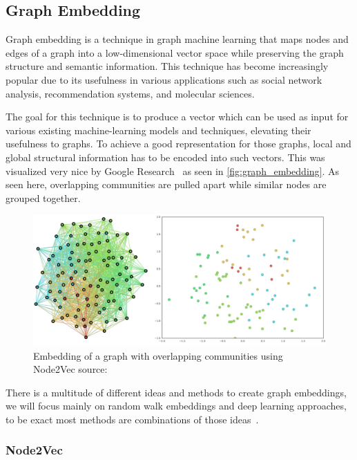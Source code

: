 \subsection{Graph Embedding}
Graph embedding is a technique in graph machine learning that maps nodes and edges of a graph into a low-dimensional vector space while preserving the graph structure and semantic information. This technique has become increasingly popular due to its usefulness in various applications such as social network analysis, recommendation systems, and molecular sciences.

The goal for this technique is to produce a vector which can be used as input for various existing machine-learning models and techniques, elevating their usefulness to graphs. To achieve a good representation for those graphs, local and global structural information has to be encoded into such vectors. This was visualized very nice by Google Research~\cite{epasto2019embedding} as seen in \autoref{fig:graph_embedding}. As seen here, overlapping communities are pulled apart while similar nodes are grouped together.

\begin{figure}[ht!]
    \centering
    \includegraphics[scale=0.35]{tex/res/graph_embedding.png}
    \caption{Embedding of a graph with overlapping communities using Node2Vec \tiny{source: \cite{epasto2019embedding}}}
    \label{fig:graph_embedding}
\end{figure}

There is a multitude of different ideas and methods to create graph embeddings, we will focus mainly on random walk embeddings and deep learning approaches, to be exact most methods are combinations of those ideas~\cite{2017graph2vec,2016node2vec,2021graphormer}.
\subsubsection{Node2Vec}

